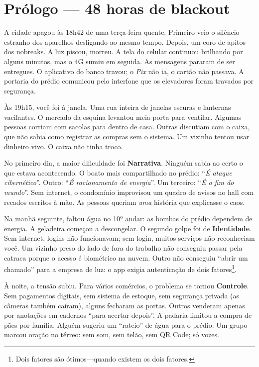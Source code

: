 \chapter*{Prólogo — 48 horas de blackout}

A cidade apagou às 18h42 de uma terça-feira quente. Primeiro veio o silêncio estranho dos aparelhos desligando ao mesmo tempo. Depois, um coro de apitos dos nobreaks. A luz piscou, morreu. A tela do celular continuou brilhando por alguns minutos, mas o 4G sumiu em seguida. As mensagens pararam de ser entregues. O aplicativo do banco travou; o \textit{Pix} não ia, o cartão não passava. A portaria do prédio comunicou pelo interfone que os elevadores foram travados por segurança.

Às 19h15, você foi à janela. Uma rua inteira de janelas escuras e lanternas vacilantes. O mercado da esquina levantou meia porta para ventilar. Algumas pessoas corriam com sacolas para dentro de casa. Outras discutiam com o caixa, que não sabia como registrar as compras sem o sistema. Um vizinho tentou usar dinheiro vivo. O caixa não tinha troco.

No primeiro dia, a maior dificuldade foi \textbf{Narrativa}. Ninguém sabia ao certo o que estava acontecendo. O boato mais compartilhado no prédio: “\textit{É ataque cibernético}”. Outro: “\textit{É racionamento de energia}”. Um terceiro: “\textit{É o fim do mundo}”. Sem internet, o condomínio improvisou um quadro de avisos no hall com recados escritos à mão. As pessoas queriam \textit{uma} história que explicasse o caos.

Na manhã seguinte, faltou água no 10º andar: as bombas do prédio dependem de energia. A geladeira começou a descongelar. O segundo golpe foi de \textbf{Identidade}. Sem internet, logins não funcionavam; sem login, muitos serviços não reconheciam você. Um vizinho preso do lado de fora do trabalho não conseguiu passar pela catraca porque o acesso é biométrico na nuvem. Outro não conseguiu “abrir um chamado” para a empresa de luz: o app exigia autenticação de dois fatores\footnote{Dois fatores são ótimos---quando existem os dois fatores.}.

À noite, a tensão subiu. Para vários comércios, o problema se tornou \textbf{Controle}. Sem pagamentos digitais, sem sistema de estoque, sem segurança privada (as câmeras também caíram), alguns fecharam as portas. Outros venderam apenas por anotações em cadernos “para acertar depois”. A padaria limitou a compra de pães por família. Alguém sugeriu um “rateio” de água para o prédio. Um grupo marcou oração no térreo: sem som, sem telão, sem QR Code; só vozes.

